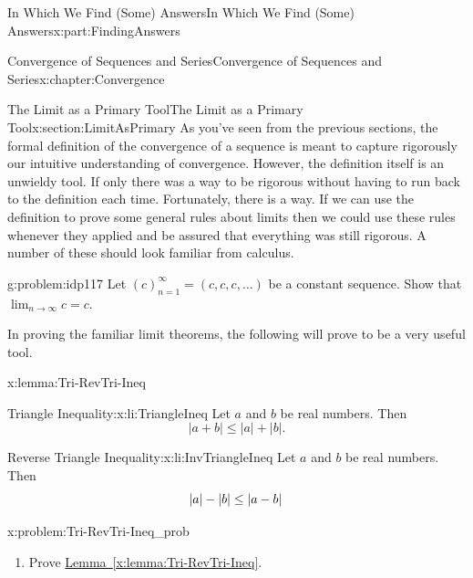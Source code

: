 \begin{partptx}{In Which We Find (Some) Answers}{}{In Which We Find (Some) Answers}{}{}{x:part:FindingAnswers}
\begin{chapterptx}{Convergence of Sequences and Series}{}{Convergence of Sequences and Series}{}{}{x:chapter:Convergence}
\begin{sectionptx}{The Limit as a Primary Tool}{}{The Limit as a Primary Tool}{}{}{x:section:LimitAsPrimary}
			As you've seen from the previous sections, the formal definition of the convergence of a sequence is meant to capture rigorously our intuitive understanding of convergence. However, the definition itself is an unwieldy tool. If only there was a way to be rigorous without having to run back to the definition each time. Fortunately, there is a way. If we can use the definition to prove some general rules about limits then we could use these rules whenever they applied and be assured that everything was still rigorous. A number of these should look familiar from calculus.%
			\begin{problem}{}{g:problem:idp117}%
				 Let \(\left(c\right)_{n=1}^\infty=(c,c,c,\ldots)\) be a constant sequence. Show that \(\lim_{n\rightarrow\infty}c=c\).%
			\end{problem}
			In proving the familiar limit theorems, the following will prove to be a very useful tool.%
			\begin{lemma}{}{}{x:lemma:Tri-RevTri-Ineq}%
				\begin{descriptionlist}
					\begin{dlimedium}{Triangle Inequality:}{x:li:TriangleIneq}%
						Let \(a\) and \(b\) be real numbers. Then%
						\begin{equation*}
							|a+b|\leq|a|+|b|\text{.}
						\end{equation*}
					\end{dlimedium}%
					\begin{dlimedium}{Reverse Triangle Inequality:}{x:li:InvTriangleIneq}%
						Let \(a\) and \(b\) be real numbers. Then%
						\begin{equation*}
							|a|-|b|\leq\left|a-b\right| {}
						\end{equation*}
					\end{dlimedium}%
				\end{descriptionlist}
			\end{lemma}
			\begin{problem}{}{x:problem:Tri-RevTri-Ineq_prob}%
				\begin{enumerate}[font=\bfseries,label=(\alph*),ref=\alph*]
					\item{}Prove \hyperref[x:lemma:Tri-RevTri-Ineq]{Lemma~{\xreffont\ref{x:lemma:Tri-RevTri-Ineq}}}.%
					\par\smallskip%

\end{enumerate}
\end{problem}
\end{sectionptx}
\end{chapterptx}
\end{partptx}
